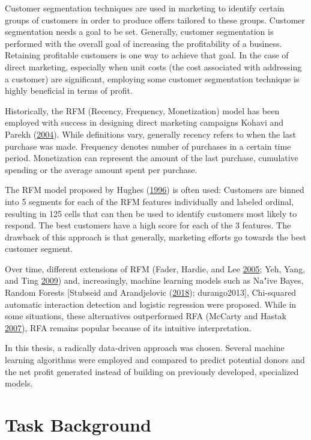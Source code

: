 \documentclass[
  11pt,
  a4paper,
  DIV=12,captions=tableheading,oneside,titlepage]{scrbook}
\begin{document}
Customer segmentation techniques are used in marketing to identify certain groups of customers in order to produce offers tailored to these groups. Customer segmentation needs a goal to be set. Generally, customer segmentation is performed with the overall goal of increasing the profitability of a business. Retaining profitable customers is one way to achieve that goal. In the case of direct marketing, especially when unit costs (the cost associated with addressing a customer) are significant, employing some customer segmentation technique is highly beneficial in terms of profit.

Historically, the RFM (Recency, Frequency, Monetization) model has been employed with success in designing direct marketing campaigns Kohavi and Parekh (\protect\hyperlink{ref-kohavi2004visualizing}{2004}). While definitions vary, generally recency refers to when the last purchase was made. Frequency denotes number of purchases in a certain time period. Monetization can represent the amount of the last purchase, cumulative spending or the average amount spent per purchase.

The RFM model proposed by Hughes (\protect\hyperlink{ref-hughes-rfm-boost-response}{1996}) is often used: Customers are binned into 5 segments for each of the RFM features individually and labeled ordinal, resulting in 125 cells that can then be used to identify customers most likely to respond. The best customers have a high score for each of the 3 features. The drawback of this approach is that generally, marketing efforts go towards the best customer segment.

Over time, different extensions of RFM (Fader, Hardie, and Lee \protect\hyperlink{ref-fader2005rfmclv}{2005}; Yeh, Yang, and Ting \protect\hyperlink{ref-yeh2009}{2009}) and, increasingly, machine learning models such as Na"ive Bayes, Random Forests {[}Stubseid and Arandjelovic (\protect\hyperlink{ref-stubseid2018}{2018}); durango2013{]}, Chi-squared automatic interaction detection and logistic regression were proposed. While in some situations, these alternatives outperformed RFA (McCarty and Hastak \protect\hyperlink{ref-MCCARTY2007656}{2007}), RFA remains popular because of its intuitive interpretation.

In this thesis, a radically data-driven approach was chosen. Several machine learning algorithms were employed and compared to predict potential donors and the net profit generated instead of building on previously developed, specialized models.

\hypertarget{task-background}{%
\section{Task Background}\label{task-background}}
\end{document}
